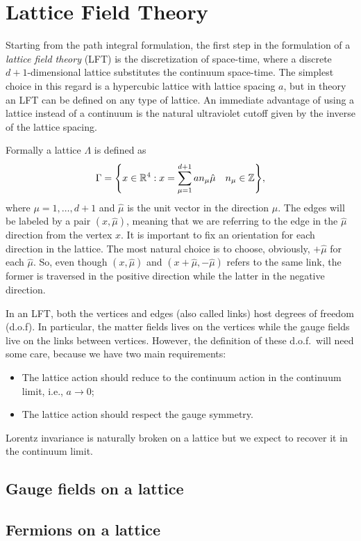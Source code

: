 \section{Lattice Field Theory}
\label{sec:lattice_field_theory}

Starting from the path integral formulation, the first step in the formulation of a \emph{lattice field theory} (LFT) is the discretization of space-time, where a discrete $d+1$-dimensional lattice substitutes the continuum space-time.
The simplest choice in this regard is a hypercubic lattice with lattice spacing $a$, but in theory an LFT can be defined on any type of lattice.
An immediate advantage of using a lattice instead of a continuum is the natural ultraviolet cutoff given by the inverse of the lattice spacing.

Formally a lattice $\Lambda$ is defined as
\begin{equation}
    \Gamma = \qty{
        x \in \mathbb{R}^4 :
        x = \sum_{\mu = 1}^{d+1} a n_{\mu} \hat{\mu} \quad
        n_{\mu} \in \mathbb{Z}},
\end{equation}
where $\mu = 1, \dots, d+1$ and $\hat{\mu}$ is the unit vector in the direction $\mu$.
The edges will be labeled by a pair $(x,\hat{\mu})$, meaning that we are referring to the edge in the $\hat{\mu}$ direction from the vertex $x$.
It is important to fix an orientation for each direction in the lattice.
The most natural choice is to choose, obviously, $+ \hat{\mu}$ for each $\hat{\mu}$.
So, even though $(x,\hat{\mu})$ and $(x + \hat{\mu}, - \hat{\mu})$ refers to the same link, the former is traversed in the positive direction while the latter in the negative direction.

In an LFT, both the vertices and edges (also called links) host degrees of freedom (d.o.f).
In particular, the matter fields lives on the vertices while the gauge fields live on the links between vertices.
However, the definition of these d.o.f.~will need some care, because we have two main requirements:
\begin{itemize}
    \item The lattice action should reduce to the continuum action in the continuum limit, i.e., $a \to 0$;
    \item The lattice action should respect the gauge symmetry.
\end{itemize}
Lorentz invariance is naturally broken on a lattice but we expect to recover it in the continuum limit.


\subsection{Gauge fields on a lattice}
\label{sub:gauge_fields_on_a_lattice}


\subsection{Fermions on a lattice}
\label{sub:fermions_on_a_lattice}
